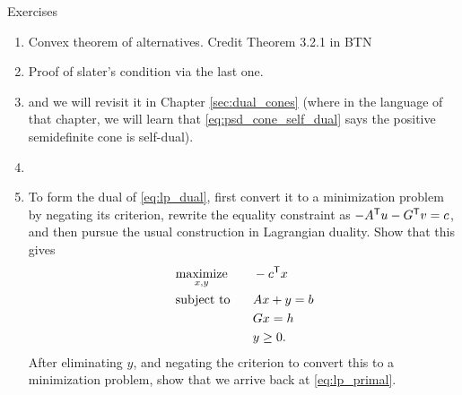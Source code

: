 \begin{xcb}{Exercises}
\begin{enumerate}[label=\thechapter.\arabic*]
\begin{enumerate}[label=\alph*.]
\item Let $y \in \R^n$ denote the label vector and $X \in \R^{n \times d}$ the
  feature matrix (whose $i\th$ row is $x_i^\T$), and define . Show that the dual of \eqref{eq:svm_primal} is (equivalent to)   
  \begin{equation}
  \label{eq:svm_dual}
  \begin{alignedat}{2}
  &\maximize_w \quad &&- \frac{1}{2} w^\T \tilde{X} \tilde{X}^\T w + \one^\T w \\ 
  &\st \quad && 0 \leq w \leq C \one \\
  & && y^\T w = 0,
  \end{alignedat}
  \end{equation}
  Hint: while the SVM problem is a QP, it will be simpler to compute the dual of
  \eqref{eq:svm_primal} directly (by forming the Lagrangian and minimizing 
  over $\beta,\beta_0,\xi$) rather than invoking general results on QP duality,
  from Example .  

\item Show that Slater's condition is always satisfied for the SVM problem
  \eqref{eq:svm_primal}, so strong duality always holds in between
  \eqref{eq:svm_primal} and \eqref{eq:svm_dual}.  
\end{enumerate}

\item \label{ex:convex_theorem_alternatives}
Convex theorem of alternatives. Credit Theorem 3.2.1 in BTN

\item \label{ex:slater_condition}
Proof of slater's condition via the last one.

\item \label{ex:psd_cone_self_dual}
and we will revisit it 
in Chapter \ref{sec:dual_cones} (where in the language of that chapter, we
will learn that \eqref{eq:psd_cone_self_dual} says the positive semidefinite
cone is self-dual).

\item \label{ex:sdp_std_dual}

\item \label{ex:sdp_dual_dual}
  To form the dual of \eqref{eq:lp_dual}, first convert it to a minimization
  problem by negating its criterion, rewrite the equality constraint as $-A^{\mathsf{T}} u
  - G^{\mathsf{T}} v = c$, and then pursue the usual construction in Lagrangian
  duality. Show that this gives    
  \begin{alignat*}{2}
  &\operatorname*{maximize}_{x,y} \quad && -c^{\mathsf{T}} x \\ 
  &\operatorname{subject\,\,to} && Ax + y = b \\
  & && Gx = h \\
  & && y \geq 0.
  \end{alignat*}
  After eliminating $y$, and negating the criterion to convert this to a
  minimization problem, show that we arrive back at \eqref{eq:lp_primal}.  


\end{enumerate}
\end{xcb}
